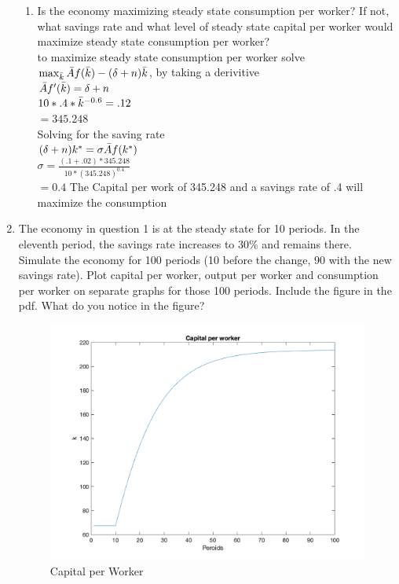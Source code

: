 \documentclass[12pt,oneside,reqno]{amsart}
\begin{document}
\begin{enumerate}
\begin{enumerate}
        \item Is the economy maximizing steady state consumption per worker? If not, what savings rate and what level of steady state capital per worker would maximize steady state consumption per worker?\\
        to maximize steady state consumption per worker solve\\ $\max_{\Bar{k}} \Bar{A}f(\Bar{k})-(\delta+n)\Bar{k}$, by taking a derivitive\\
        $\Bar{A}f'(\Bar{k})=\delta+n$\\
        $10*.4*\Bar{k}^{-0.6}=.12$\\
        $=345.248$\\
        Solving for the saving rate\\
        $(\delta+n)k^*=\sigma\Bar{A}f(k^*)$\\
        $\sigma = \frac{(.1+.02)*345.248}{10*(345.248)^{0.4}}$\\
        $=0.4$ 
        The Capital per work of 345.248 and a savings rate of .4 will maximize the consumption
    \end{enumerate}
    \item The economy in question 1 is at the steady state for 10 periods. In the eleventh period, the savings rate increases to 30\% and remains there. Simulate the economy for 100 periods (10 before the change, 90 with the new savings rate). Plot capital per worker, output per worker and consumption per worker on separate graphs for those 100 periods. Include the figure in the pdf. What do you notice in the figure?
    \begin{figure}[H]
        \centering
        \includegraphics[width =.5\linewidth]{HW1/pics/HW1_Q2_a.png}
        \caption{Capital per Worker}
    \end{figure}
    \vspace{-.5cm}

\end{enumerate}
\end{document}
